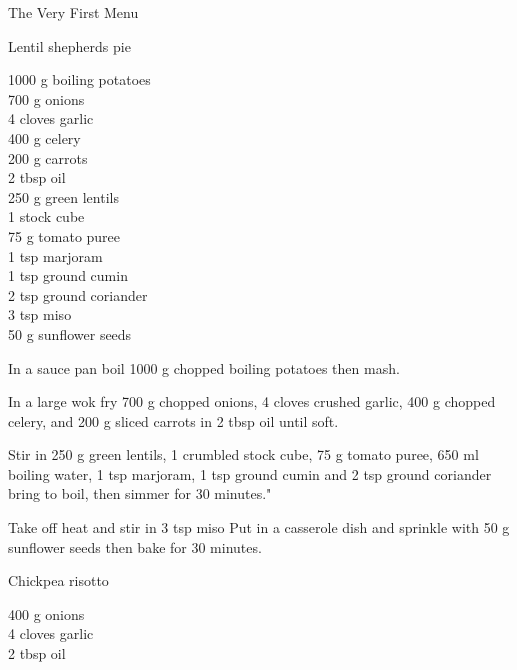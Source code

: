 \begin{menu}{The Very First Menu}
\begin{recipe}{2}{Lentil shepherds pie}
		\begin{ingredients}
		1000 g boiling potatoes  \\
	700 g onions  \\
	4 cloves garlic  \\
	400 g celery  \\
	200 g carrots  \\
	2 tbsp oil  \\
	250 g green lentils  \\
	1  stock cube  \\
	75 g tomato puree  \\
	1 tsp marjoram  \\
	1 tsp ground cumin  \\
	2 tsp ground coriander  \\
	3 tsp miso  \\
	50 g sunflower seeds  \\
	
		\end{ingredients}
	
    \begin{instructions}
    \item 
        In a sauce pan boil
        1000 g chopped boiling potatoes
        then mash.
      \item 
        In a large wok fry
        700 g chopped onions,
        4 cloves crushed garlic,
        400 g chopped celery,
        and
        200 g sliced carrots
        in
        2 tbsp  oil
        until soft.
      \item 
        Stir in
        250 g  green lentils,
        1  crumbled stock cube,
        75 g  tomato puree,
        650 ml  boiling water,
        1 tsp  marjoram,
        1 tsp  ground cumin
        and
        2 tsp  ground coriander
        bring to boil,
        then simmer for 30 minutes."
      \item 
        Take off heat and stir in
        3 tsp  miso
        Put in a casserole dish
        and sprinkle with 
        50 g  sunflower seeds
        then bake  for 30 minutes.
      
    \end{instructions}
    \end{recipe}%
  
    \begin{recipe}{2}{Chickpea risotto}%
    
		\begin{ingredients}
		400 g onions  \\
	4 cloves garlic  \\
	2 tbsp oil  \\
	

\end{ingredients}
\end{recipe}
\end{menu}
